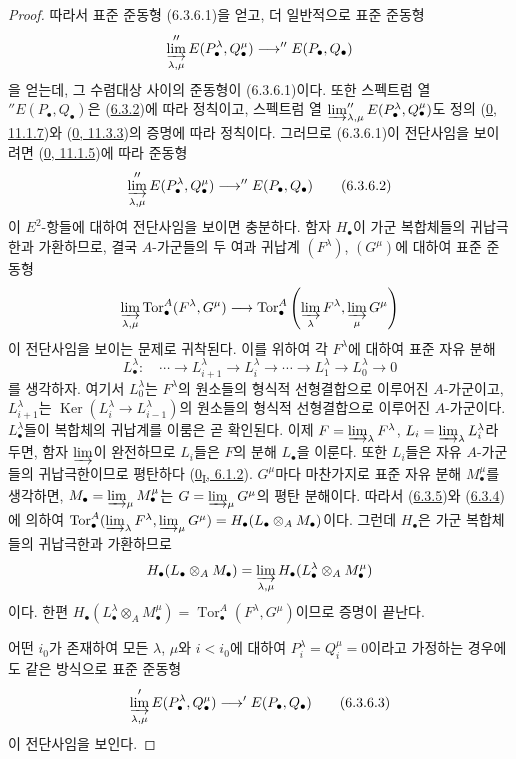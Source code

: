 \begin{proof}
따라서 표준 준동형 (6.3.6.1)을 얻고, 더 일반적으로 표준 준동형
\[
  \varinjlim_{\lambda,\mu}''E(P_\bullet^\lambda,Q_\bullet^\mu)
  \longrightarrow ''E(P_\bullet,Q_\bullet)
\]
을 얻는데, 그 수렴대상 사이의 준동형이 (6.3.6.1)이다. 또한 스펙트럼
열 $''E(P_\bullet,Q_\bullet)$은
(\hyperref[III.6.3.2-fr]{6.3.2})에 따라 정칙이고, 스펙트럼 열
$\varinjlim_{\lambda,\mu}''E(P_\bullet^\lambda,Q_\bullet^\mu)$도
정의 (\hyperref[0.11.1.7-fr]{0, 11.1.7})와
(\hyperref[0.11.3.3-fr]{0, 11.3.3})의 증명에 따라 정칙이다. 그러므로
(6.3.6.1)이 전단사임을 보이려면
(\hyperref[0.11.1.5-fr]{0, 11.1.5})에 따라 준동형
\[
  \varinjlim_{\lambda,\mu}''E(P_\bullet^\lambda,Q_\bullet^\mu)
  \longrightarrow ''E(P_\bullet,Q_\bullet)
  \tag{6.3.6.2}\label{III.6.3.6.2.fr}
\]
이 $E^2$-항들에 대하여 전단사임을 보이면 충분하다. 함자
$H_\bullet$이 가군 복합체들의 귀납극한과 가환하므로, 결국
$A$-가군들의 두 여과 귀납계 $(F^\lambda)$, $(G^\mu)$에 대하여 표준
준동형
\[
  \varinjlim_{\lambda,\mu}\operatorname{Tor}_\bullet^A(F^\lambda,G^\mu)
  \longrightarrow
  \operatorname{Tor}_\bullet^A
  \left(\varinjlim_\lambda F^\lambda,
        \varinjlim_\mu G^\mu\right)
\]
이 전단사임을 보이는 문제로 귀착된다. 이를 위하여 각 $F^\lambda$에
대하여 표준 자유 분해
\[
  L_\bullet^\lambda:\quad
  \cdots\longrightarrow L_{i+1}^\lambda
  \longrightarrow L_i^\lambda\longrightarrow\cdots
  \longrightarrow L_1^\lambda\longrightarrow L_0^\lambda\longrightarrow0
\]
를 생각하자. 여기서 $L_0^\lambda$는 $F^\lambda$의 원소들의 형식적
선형결합으로 이루어진 $A$-가군이고, $L_{i+1}^\lambda$는
$\operatorname{Ker}(L_i^\lambda\to L_{i-1}^\lambda)$의 원소들의
형식적 선형결합으로 이루어진 $A$-가군이다. $L_\bullet^\lambda$들이
복합체의 귀납계를 이룸은 곧 확인된다. 이제
$F=\varinjlim_\lambda F^\lambda$, $L_i=\varinjlim_\lambda L_i^\lambda$라
두면, 함자 $\varinjlim$이 완전하므로 $L_i$들은 $F$의 분해
$L_\bullet$을 이룬다. 또한 $L_i$들은 자유 $A$-가군들의 귀납극한이므로
평탄하다 (\hyperref[0.6.1.2-ko]{0\textsubscript{I}, 6.1.2}).
$G^\mu$마다 마찬가지로 표준 자유 분해 $M_\bullet^\mu$를 생각하면,
$M_\bullet=\varinjlim_\mu M_\bullet^\mu$는
$G=\varinjlim_\mu G^\mu$의 평탄 분해이다. 따라서
(\hyperref[III.6.3.5-fr]{6.3.5})와
(\hyperref[III.6.3.4-fr]{6.3.4})에 의하여
$\operatorname{Tor}_\bullet^A(\varinjlim_\lambda F^\lambda,
\varinjlim_\mu G^\mu)=H_\bullet(L_\bullet\otimes_A M_\bullet)$이다.
그런데 $H_\bullet$은 가군 복합체들의 귀납극한과 가환하므로
\[
  H_\bullet(L_\bullet\otimes_A M_\bullet)
  =\varinjlim_{\lambda,\mu}
   H_\bullet(L_\bullet^\lambda\otimes_A M_\bullet^\mu)
\]
이다. 한편
$H_\bullet(L_\bullet^\lambda\otimes_A M_\bullet^\mu)
=\operatorname{Tor}_\bullet^A(F^\lambda,G^\mu)$이므로 증명이 끝난다.

어떤 $i_0$가 존재하여 모든 $\lambda$, $\mu$와 $i<i_0$에 대하여
$P_i^\lambda=Q_i^\mu=0$이라고 가정하는 경우에도 같은 방식으로 표준
준동형
\[
  \varinjlim_{\lambda,\mu}'E(P_\bullet^\lambda,Q_\bullet^\mu)
  \longrightarrow'E(P_\bullet,Q_\bullet)
  \tag{6.3.6.3}\label{III.6.3.6.3.fr}
\]
이 전단사임을 보인다.
\end{proof}

